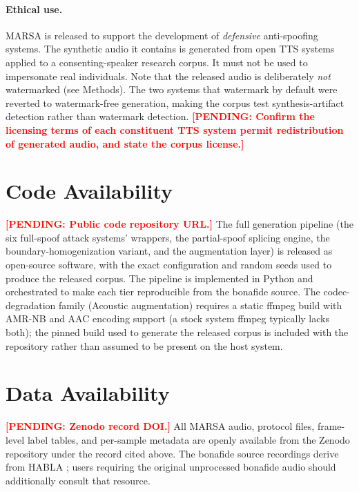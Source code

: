\documentclass[11pt]{article}
\newcommand{\PENDING}[1]{\textcolor{red}{\textbf{[PENDING: #1]}}}
\begin{document}
\paragraph{Ethical use.} MARSA is released to support the development of
\emph{defensive} anti-spoofing systems. The synthetic audio it contains
is generated from open TTS systems applied to a consenting-speaker
research corpus. It must not be used to impersonate real individuals.
Note that the released audio is deliberately \emph{not} watermarked (see
Methods). The two systems that watermark by default were reverted to
watermark-free generation, making the corpus test synthesis-artifact
detection rather than watermark detection. \PENDING{Confirm the licensing
terms of each constituent TTS system permit redistribution of generated
audio, and state the corpus license.}

\section*{Code Availability}

\PENDING{Public code repository URL.} The full generation pipeline (the
six full-spoof attack systems' wrappers, the partial-spoof splicing
engine, the boundary-homogenization variant, and the augmentation
layer) is released as open-source software, with the exact configuration
and random seeds used to produce the released corpus. The pipeline is
implemented in Python and orchestrated to make each tier reproducible
from the bonafide source. The codec-degradation family (Acoustic
augmentation) requires a static ffmpeg build with AMR-NB and AAC
encoding support (a stock system ffmpeg typically lacks both); the
pinned build used to generate the released corpus is included with the
repository rather than assumed to be present on the host system.

\section*{Data Availability}

\PENDING{Zenodo record DOI.} All MARSA audio, protocol files, frame-level
label tables, and per-sample metadata are openly available from the
Zenodo repository under the record cited above. The bonafide source
recordings derive from HABLA \citep{habla}; users requiring the original
unprocessed bonafide audio should additionally consult that resource.

\end{document}
